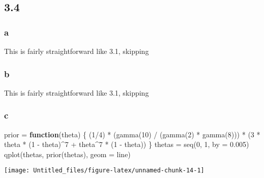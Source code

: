\documentclass[
]{article}
\newenvironment{Shaded}{\begin{snugshade}}{\end{snugshade}}
\newcommand{\AttributeTok}[1]{\textcolor[rgb]{0.77,0.63,0.00}{#1}}
\newcommand{\ControlFlowTok}[1]{\textcolor[rgb]{0.13,0.29,0.53}{\textbf{#1}}}
\newcommand{\DecValTok}[1]{\textcolor[rgb]{0.00,0.00,0.81}{#1}}
\newcommand{\FloatTok}[1]{\textcolor[rgb]{0.00,0.00,0.81}{#1}}
\newcommand{\FunctionTok}[1]{\textcolor[rgb]{0.00,0.00,0.00}{#1}}
\newcommand{\NormalTok}[1]{#1}
\newcommand{\OtherTok}[1]{\textcolor[rgb]{0.56,0.35,0.01}{#1}}
\newcommand{\SpecialCharTok}[1]{\textcolor[rgb]{0.00,0.00,0.00}{#1}}
\newcommand{\StringTok}[1]{\textcolor[rgb]{0.31,0.60,0.02}{#1}}
\begin{document}
\hypertarget{section-3}{%
\subsection{3.4}\label{section-3}}

\hypertarget{a-2}{%
\subsubsection{a}\label{a-2}}

This is fairly straightforward like 3.1, skipping

\hypertarget{b-2}{%
\subsubsection{b}\label{b-2}}

This is fairly straightforward like 3.1, skipping

\hypertarget{c-2}{%
\subsubsection{c}\label{c-2}}

\begin{Shaded}
\begin{Highlighting}[]
\NormalTok{prior }\OtherTok{=} \ControlFlowTok{function}\NormalTok{(theta) \{}
\NormalTok{  (}\DecValTok{1}\SpecialCharTok{/}\DecValTok{4}\NormalTok{) }\SpecialCharTok{*}\NormalTok{ (}\FunctionTok{gamma}\NormalTok{(}\DecValTok{10}\NormalTok{) }\SpecialCharTok{/}\NormalTok{ (}\FunctionTok{gamma}\NormalTok{(}\DecValTok{2}\NormalTok{) }\SpecialCharTok{*} \FunctionTok{gamma}\NormalTok{(}\DecValTok{8}\NormalTok{))) }\SpecialCharTok{*} 
\NormalTok{    (}\DecValTok{3} \SpecialCharTok{*}\NormalTok{ theta }\SpecialCharTok{*}\NormalTok{ (}\DecValTok{1} \SpecialCharTok{{-}}\NormalTok{ theta)}\SpecialCharTok{\^{}}\DecValTok{7} \SpecialCharTok{+}\NormalTok{ theta}\SpecialCharTok{\^{}}\DecValTok{7} \SpecialCharTok{*}\NormalTok{ (}\DecValTok{1} \SpecialCharTok{{-}}\NormalTok{ theta))}
\NormalTok{\}}
\NormalTok{thetas }\OtherTok{=} \FunctionTok{seq}\NormalTok{(}\DecValTok{0}\NormalTok{, }\DecValTok{1}\NormalTok{, }\AttributeTok{by =} \FloatTok{0.005}\NormalTok{)}
\FunctionTok{qplot}\NormalTok{(thetas, }\FunctionTok{prior}\NormalTok{(thetas), }\AttributeTok{geom =} \StringTok{\textquotesingle{}line\textquotesingle{}}\NormalTok{)}
\end{Highlighting}
\end{Shaded}

\begin{center}\texttt{[image: Untitled\_files/figure-latex/unnamed-chunk-14-1]} \end{center}
\end{document}
